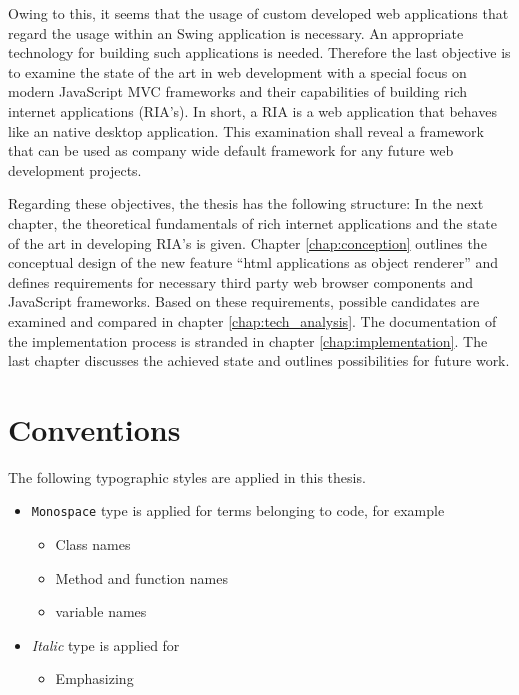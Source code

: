Owing to this, it seems that the usage of custom developed web applications that regard the usage within an Swing application is necessary.
An appropriate technology for building such applications is needed.
Therefore the last objective is to examine the state of the art in web development with a special focus on modern JavaScript MVC frameworks and their capabilities of building rich internet applications (RIA's).
In short, a RIA is a web application that behaves like an native desktop application.
This examination shall reveal a framework that can be used as company wide default framework for any future web development projects.

Regarding these objectives, the thesis has the following structure: In the next chapter, the theoretical fundamentals of rich internet applications and the state of the art in developing RIA's is given.
Chapter \ref{chap:conception} outlines the conceptual design of the new feature \enquote{html applications as object renderer} and defines requirements for necessary third party web browser components and JavaScript frameworks.
Based on these requirements, possible candidates are examined and compared in chapter \ref{chap:tech_analysis}.
The documentation of the implementation process is stranded in chapter \ref{chap:implementation}.
The last chapter discusses the achieved state and outlines possibilities for future work.\\[10mm]
 
\section{Conventions}

The following typographic styles are applied in this thesis.

\begin{itemize}
\item \texttt{Monospace} type is applied for terms belonging to code, for example
	\begin{itemize}
		\item Class names
		\item Method and function names
		\item variable names
	\end{itemize}
\item \emph{Italic} type is applied for
	\begin{itemize}
		\item Emphasizing
	\end{itemize}
\end{itemize}
